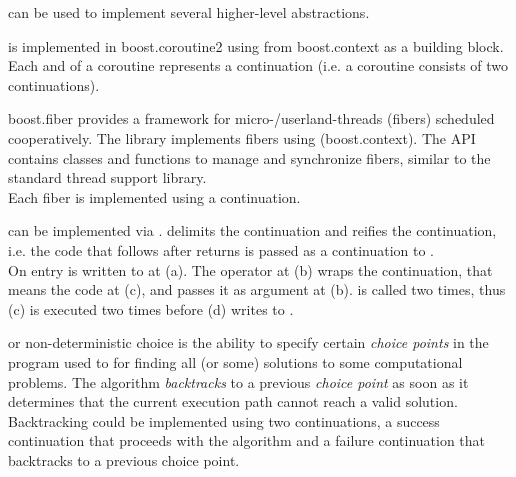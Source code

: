 \newpage
{}

\cc can be used to implement several higher-level abstractions.



is implemented in boost.coroutine2\cite{bcoroutine2} using \cc from
boost.context\cite{bcontext} as a building block. Each  and
 of a coroutine represents a continuation (i.e. a coroutine
consists of two continuations).



boost.fiber\cite{bfiber} provides a framework for micro-/userland-threads
(fibers) scheduled cooperatively. The library implements fibers using \cc
(boost.context\cite{bcontext}). The API contains classes and functions to manage
and synchronize fibers, similar to the standard thread support library.\\
Each fiber is implemented using a continuation.


\label{delimited}

can be implemented via \cc.  delimits the continuation and
 reifies the continuation, i.e. the code that follows after
 returns is passed as a continuation to .\\

On entry  is written to  at (a). The  operator
at (b) wraps the continuation, that means the code at (c), and passes it as
argument  at (b).  is called two times, thus (c) is
executed two times before (d) writes  to .



or non-deterministic choice is the ability to specify certain
\emph{choice points} in the program used to for finding all (or some) solutions
to some computational problems. The algorithm \emph{backtracks} to a previous
\emph{choice point} as soon as it determines that the current execution path cannot
reach a valid solution.\\
Backtracking could be implemented using two continuations, a success
continuation that proceeds with the algorithm and a failure continuation that
backtracks to a previous choice point\cite{Ferguson}.
